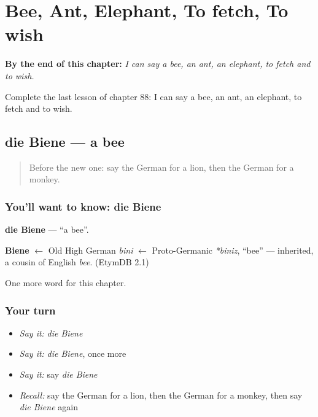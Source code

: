 
\chapter{Bee, Ant, Elephant, To fetch, To wish}
\label{ch:ge-bee-ant-elephant-to-fetch-to-wish}

\begin{chapteropening}
\textbf{By the end of this chapter:} \emph{I can say a bee, an ant, an elephant, to fetch and to wish.}

Complete the last lesson of chapter 88: I can say a bee, an ant, an elephant, to fetch and to wish.
\end{chapteropening}

\section[die Biene]{die Biene — a bee}

\label{lesson:GE-C88-biene}



\begin{quote}
Before the new one: say the German for a lion, then the German for a monkey.
\end{quote}

\subsection*{You'll want to know: die Biene}
\textbf{die Biene} — \textquotedblleft{}a bee\textquotedblright{}.

\begin{cousinweb}
\textbf{Biene} $\leftarrow$ Old High German \emph{bini} $\leftarrow$ Proto-Germanic \emph{*biniz}, \textquotedblleft{}bee\textquotedblright{} — inherited, a cousin of English \emph{bee}. (EtymDB 2.1)
\end{cousinweb}

\begin{grammarlens}[title={What you've built}]
One more word for this chapter.
\end{grammarlens}

\subsection*{Your turn}
\begin{itemize}
\raggedright
  \item \emph{Say it:} \emph{die Biene}
  \item \emph{Say it:} \emph{die Biene}, once more
  \item \emph{Say it:} say \emph{die Biene}
  \item \emph{Recall:} say the German for a lion, then the German for a monkey, then say \emph{die Biene} again
\end{itemize}

